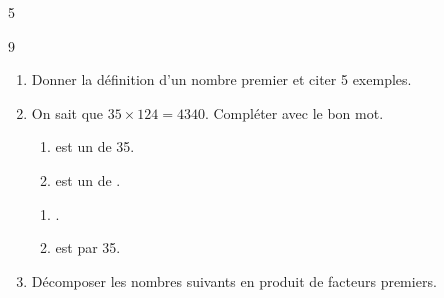 \documentclass[a4paper]{book}
\begin{document}
{\begin{exerciceNote}{5}
\begin{enumerate}[leftmargin=*]
\begin{minipage}{0.45\linewidth}
                \vspace{1cm}
            \end{minipage}
        \end{enumerate}       
    \end{exerciceNote}


    \begin{exerciceNote}{9}
        \begin{enumerate}[leftmargin=*]
            \item Donner la définition d'un nombre premier et citer 5 exemples.

            \medskip\dotfill
            
            \medskip\dotfill

            \item On sait que $35\times124=4340$.
            Compléter avec le bon mot.

            \medskip
            
            \begin{minipage}{0.45\linewidth}                
                \begin{enumerate}
                    \item {} est un \points[6] de 35.

                    \medskip
                    
                    \item {} est un \points[6] de .
                \end{enumerate}
            \end{minipage}
            \hfill\vline\hfill
            \begin{minipage}{0.45\linewidth}
                \begin{enumerate}
                    \item {}  \points[6] .

                    \medskip
                    
                    \item {} est \points[6] par 35.
                \end{enumerate}
            
            \end{minipage}

            \medskip

            \item Décomposer les nombres suivants en produit de facteurs premiers.


\end{enumerate}
\end{exerciceNote}}
\end{document}
